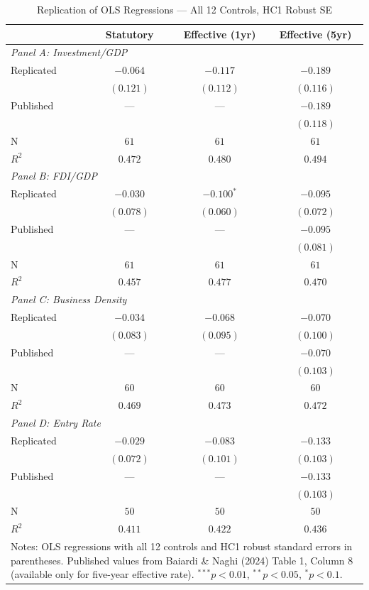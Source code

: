 \begin{table}[htbp]
\centering
\caption{Replication of OLS Regressions --- All 12 Controls, HC1 Robust SE}
\label{tab:replication}
\small
\begin{tabular}{lccc}
\hline\hline
  & Statutory & Effective (1yr) & Effective (5yr) \\
\hline
\multicolumn{4}{l}{\textit{Panel A: Investment/GDP}} \\[3pt]
Replicated & $-0.064$ & $-0.117$ & $-0.189$ \\
 & $(0.121)$ & $(0.112)$ & $(0.116)$ \\
Published & --- & --- & $-0.189$ \\
 &  &  & $(0.118)$ \\
N & $61$ & $61$ & $61$ \\
$R^2$ & $0.472$ & $0.480$ & $0.494$ \\[6pt]
\multicolumn{4}{l}{\textit{Panel B: FDI/GDP}} \\[3pt]
Replicated & $-0.030$ & $-0.100^{*}$ & $-0.095$ \\
 & $(0.078)$ & $(0.060)$ & $(0.072)$ \\
Published & --- & --- & $-0.095$ \\
 &  &  & $(0.081)$ \\
N & $61$ & $61$ & $61$ \\
$R^2$ & $0.457$ & $0.477$ & $0.470$ \\[6pt]
\multicolumn{4}{l}{\textit{Panel C: Business Density}} \\[3pt]
Replicated & $-0.034$ & $-0.068$ & $-0.070$ \\
 & $(0.083)$ & $(0.095)$ & $(0.100)$ \\
Published & --- & --- & $-0.070$ \\
 &  &  & $(0.103)$ \\
N & $60$ & $60$ & $60$ \\
$R^2$ & $0.469$ & $0.473$ & $0.472$ \\[6pt]
\multicolumn{4}{l}{\textit{Panel D: Entry Rate}} \\[3pt]
Replicated & $-0.029$ & $-0.083$ & $-0.133$ \\
 & $(0.072)$ & $(0.101)$ & $(0.103)$ \\
Published & --- & --- & $-0.133$ \\
 &  &  & $(0.103)$ \\
N & $50$ & $50$ & $50$ \\
$R^2$ & $0.411$ & $0.422$ & $0.436$ \\[6pt]
\hline\hline
\multicolumn{4}{p{0.9\textwidth}}{\footnotesize Notes: OLS regressions with all 12 controls and HC1 robust standard errors in parentheses. Published values from Baiardi \& Naghi (2024) Table 1, Column 8 (available only for five-year effective rate). $^{***}p<0.01$, $^{**}p<0.05$, $^{*}p<0.1$.} \\
\end{tabular}
\end{table}